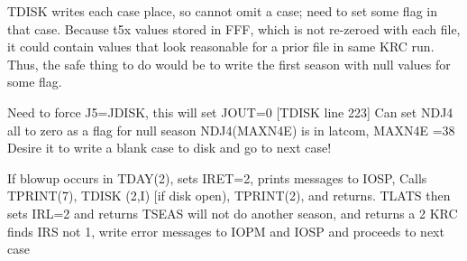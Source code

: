 \documentclass{article}
\begin{document}
TDISK writes each case place, so cannot omit a case; need to set some flag in
that case.  Because t5x values stored in FFF, which is not re-zeroed with each
file, it could contain values that look reasonable for a prior file in same KRC
run. Thus, the safe thing to do would be to write the first season with null
values for some flag.

Need to force J5=JDISK, this will set JOUT=0 [TDISK line 223] 
Can set NDJ4 all to zero as a flag for null season 
 NDJ4(MAXN4E) is in latcom, MAXN4E =38
Desire it to write a blank case to disk and go to next case!

If blowup occurs in TDAY(2), sets IRET=2, prints messages to IOSP, Calls TPRINT(7), TDISK (2,I) [if disk open), TPRINT(2), and returns.
\qi TLATS then sets IRL=2 and returns 
\qi TSEAS will not do another season, and returns a 2
\qi KRC finds IRS not 1, write error messages to IOPM and IOSP and proceeds to next case
\end{document}
